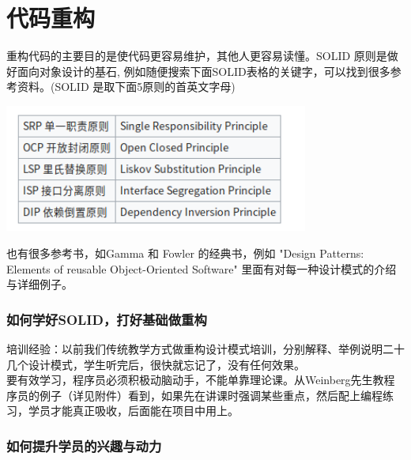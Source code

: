 \chapter{代码重构} %

重构代码的主要目的是使代码更容易维护，其他人更容易读懂。SOLID
原则是做好面向对象设计的基石,
例如随便搜索下面SOLID表格的关键字，可以找到很多参考资料。(SOLID
是取下面5原则的首英文字母)


\includegraphics[width=10cm]{Screenshotfrom2023-11-0220-45-52.png}

也有很多参考书，如Gamma 和 Fowler 的经典书，例如 "Design Patterns:
Elements of reusable Object-Oriented Software"
里面有对每一种设计模式的介绍与详细例子。

\hypertarget{ux5982ux4f55ux5b66ux597dsolidux6253ux597dux57faux7840ux505aux91cdux6784}{%
\subsection{如何学好SOLID，打好基础做重构}\label{ux5982ux4f55ux5b66ux597dsolidux6253ux597dux57faux7840ux505aux91cdux6784}}

培训经验：以前我们传统教学方式做重构设计模式培训，分别解释、举例说明二十几个设计模式，学生听完后，很快就忘记了，没有任何效果。\\
要有效学习，程序员必须积极动脑动手，不能单靠理论课。从Weinberg先生教程序员的例子（详见附件）看到，如果先在讲课时强调某些重点，然后配上编程练习，学员才能真正吸收，后面能在项目中用上。

\hypertarget{ux5982ux4f55ux63d0ux5347ux5b66ux5458ux7684ux5174ux8da3ux4e0eux52a8ux529b}{%
\subsection{如何提升学员的兴趣与动力}\label{ux5982ux4f55ux63d0ux5347ux5b66ux5458ux7684ux5174ux8da3ux4e0eux52a8ux529b}}

